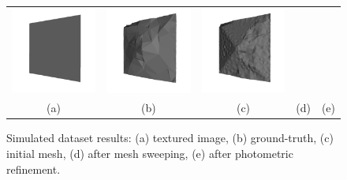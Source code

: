 \begin{figure}[t]
\begin{tabular}{ccccc}
\includegraphics[height=0.18\textwidth]{./img/synth2_init}&
\includegraphics[height=0.18\textwidth]{./img/synth2_after_sweep}&
\includegraphics[height=0.18\textwidth]{./img/synth2_after_photo}\\
(a) &
(b)&
(c) &
(d) &
(e)\\
\end{tabular}
\caption{Simulated dataset results: (a) textured image, (b) ground-truth, (c) initial mesh, (d) after mesh sweeping, (e) after photometric refinement.}
\label{fig:simulated1}
\end{figure}



